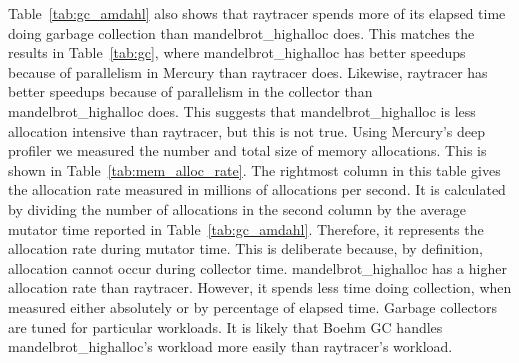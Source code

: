 Table~\ref{tab:gc_amdahl} also shows that raytracer spends more of its
elapsed time doing garbage collection than mandelbrot\_highalloc does.
This matches the results in Table~\ref{tab:gc},
where mandelbrot\_highalloc has better speedups because of parallelism in
Mercury than raytracer does.
Likewise,
raytracer has better speedups because of parallelism in the collector
than mandelbrot\_highalloc does.
This suggests that mandelbrot\_highalloc is less allocation intensive than
raytracer,
but this is not true.
Using Mercury's deep profiler we measured the number and total size of memory
allocations.
This is shown in Table~\ref{tab:mem_alloc_rate}.
The rightmost column in this table gives the allocation rate
measured in millions of allocations per second.
It is calculated by dividing the number of allocations in the second column
by the average mutator time reported in Table~\ref{tab:gc_amdahl}.
Therefore, it represents the allocation rate during mutator time.
This is deliberate because,
by definition,
allocation cannot occur during collector time.
mandelbrot\_highalloc has a higher allocation rate than raytracer.
However,
it spends less time doing collection, when measured either absolutely
or by percentage of elapsed time.
Garbage collectors are tuned for particular workloads.
It is likely that Boehm GC handles mandelbrot\_highalloc's workload more
easily than raytracer's workload.




